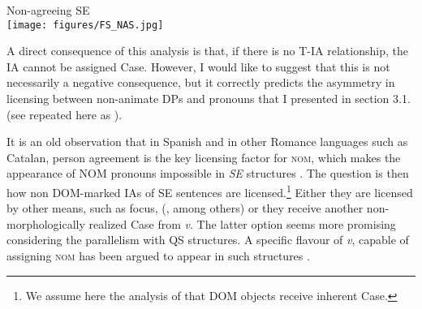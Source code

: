 \documentclass[output=paper,colorlinks,citecolor=brown]{langscibook}
\begin{document}

\ea \label{ex:05:analysisb}
Non-agreeing SE \\
\texttt{[image: figures/FS\_NAS.jpg]}
\z


A direct consequence of this analysis is that, if there is no T-IA relationship, the IA cannot be assigned Case. However, I would like to suggest that this is not necessarily a negative consequence, but it correctly predicts the asymmetry in licensing between non-animate DPs and pronouns that I presented in section 3.1. (see  repeated here as ).

\ea \label{ex:05:SESPperscopy}
\z \z

It is an old observation that in Spanish and in other Romance languages such as Catalan, person agreement is the key licensing factor for \textsc{nom}, which makes the appearance of NOM pronouns impossible in \textit{SE} structures \citep{Bianchi2001,Bianchi2003,Rigau1991}. The question is then how non DOM-marked IAs of SE sentences are licensed.\footnote{We assume here the analysis of \citet[248]{OrdonezTrevino2016} that DOM objects receive inherent Case.} Either they are licensed by other means, such as focus, (\citealt{Belletti,Rossello2000,Etxepare&Gallego2019}, among others) or they receive another non-morphologically realized Case from \textit{v}. The latter option seems more promising considering the parallelism with QS structures. A specific flavour of \textit{v}, capable of assigning \textsc{nom} has been argued to appear in such structures \citep{Boeckx2008,Lopez2007,Gallego2018}.
\end{document}
